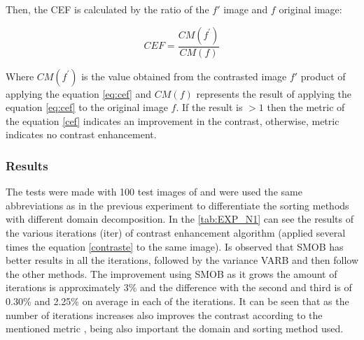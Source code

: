 Then, the CEF is calculated by the ratio of the $f'$ image and $f$ original image:

\begin{equation}
CEF = \frac{CM(f^{'})}{CM(f)}
\label{cef}
\end{equation}

Where $CM(f^{'})$ is the value obtained from the contrasted image $f'$ product of applying the equation \ref{eq:cef} and $CM(f)$ represents the result of applying the equation \ref{eq:cef} to the original image $f$. If the result is $> 1$ then the metric of the equation \ref{cef} indicates an improvement in the contrast, otherwise, metric indicates no contrast enhancement.



\subsubsection{Results}
The tests were made with 100 test images of \cite{arbelaez2007berkeley} and were used the same abbreviations as in the previous experiment to differentiate the sorting methods with different domain decomposition. 
In the \ref{tab:EXP_N1}  can see the results of the various iterations (iter) of contrast enhancement algorithm (applied several times the equation \ref{contraste} to the same image).  
Is observed that SMOB has better results in all the iterations, followed by the variance VARB and then follow the other methods. The improvement using SMOB as it grows the amount  of iterations is approximately 3\% and the difference with the second and third is of 0.30\% and 2.25\% on average in each of the iterations.
It can be seen that as the number of iterations increases also improves the contrast according to the mentioned metric , being also important the domain and sorting method used.

